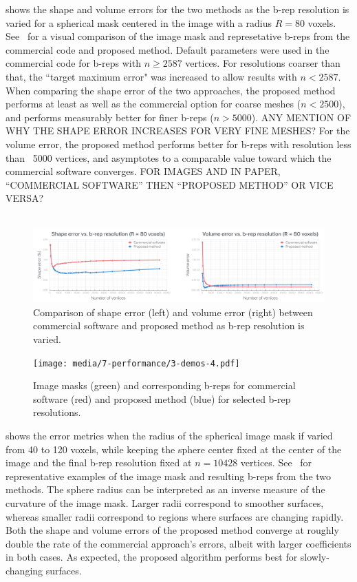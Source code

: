  shows the shape and volume errors for the two methods as the b-rep resolution is varied for a spherical mask centered in the image with a radius $R = 80$ voxels. See~ for a visual comparison of the image mask and represetative b-reps from the commercial code and proposed method. Default parameters were used in the commercial code for b-reps with $n \ge 2587$ vertices. For resolutions coarser than that, the ``target maximum error" was increased to allow results with $n < 2587$. When comparing the shape error of the two approaches, the proposed method performs at least as well as the commercial option for coarse meshes ($n < 2500$), and performs measurably better for finer b-reps ($n > 5000$). ANY MENTION OF WHY THE SHAPE ERROR INCREASES FOR VERY FINE MESHES? For the volume error, the proposed method performs better for b-reps with resolution less than ~5000 vertices, and asymptotes to a comparable value toward which the commercial software converges. FOR IMAGES AND IN PAPER, ``COMMERCIAL SOFTWARE'' THEN ``PROPOSED METHOD'' OR VICE VERSA?\\ \\
\begin{figure}[ht!]
	\centering
	\includegraphics[scale=0.25]{media/7-performance/1-graph-1.pdf}
	\caption{Comparison of shape error (left) and volume error (right) between commercial software and proposed method as b-rep resolution is varied.}
	\label{fig:graph1}
\end{figure}
\begin{figure}[ht!]
	\centering
	\texttt{[image: media/7-performance/3-demos-4.pdf]}
	\caption{Image masks (green) and corresponding b-reps for commercial software (red) and proposed method (blue) for selected b-rep resolutions.}
	\label{fig:demos1}
\end{figure}
%
 shows the error metrics when the radius of the spherical image mask if varied from 40 to 120 voxels, while keeping the sphere center fixed at the center of the image and the final b-rep resolution fixed at $n = 10428$ vertices. See~ for representative examples of the image mask and resulting b-reps from the two methods. The sphere radius can be interpreted as an inverse measure of the curvature of the image mask. Larger radii correspond to smoother surfaces, whereas smaller radii correspond to regions where surfaces are changing rapidly. Both the shape and volume errors of the proposed method converge at roughly double the rate of the commercial approach's errors, albeit with larger coefficients in both cases. As expected, the proposed algorithm performs best for slowly-changing surfaces.
